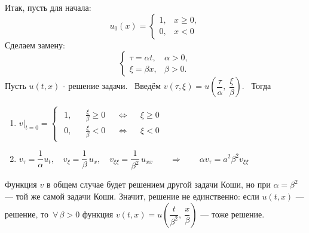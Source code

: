 \documentclass[../main.tex]{subfiles}
\begin{document}
Итак, пусть для начала:
\begin{equation*}
u_0(x) = \begin{cases} 
	1, &x \geq 0, \\
	0, &x < 0 
\end{cases} 
\end{equation*}
Сделаем замену: 
\begin{equation*}
\begin{cases}
	\tau = \alpha t, &\alpha > 0, \\
	\xi = \beta x, &\beta > 0.
\end{cases}
\end{equation*}
Пусть $u(t, x)$ - решение задачи. \ Введём $v(\tau, \xi) = u\left(\dfrac{\tau}{\alpha},\ \dfrac{\xi}{\beta}\right)$. \ Тогда
\begin{enumerate}
	\vspace{-0.7em} %
	\item $v\bigr|_{t=0} = \begin{cases} \begin{aligned}
		1, && \frac{\xi}{\beta} \geq 0 &&\Leftrightarrow && \xi \geq 0 \\
		0, && \frac{\xi}{\beta} < 0 && \Leftrightarrow && \xi < 0
	\end{aligned}\end{cases}$

	\item $v_\tau = \dfrac{1}{\alpha}u_t, \quad v_\xi = \dfrac{1}{\beta}\, u_x, \quad v_{\xi \xi} = \dfrac{1}{\beta^2}\, u_{xx} \qquad\Rightarrow\qquad \alpha v_{\tau} = a^2 \beta^2 v_{\xi \xi}$
\end{enumerate}

Функция $v$ в общем случае будет решением другой задачи Коши, но при $\alpha = \beta^2$ --- той же самой задачи Коши. Значит, решение не единственно: если $u(t,x)$ --- решение, то $\,\forall\, \beta > 0$ функция $v(t,x) = u\left(\dfrac{t}{\beta^2},\ \dfrac{x}{\beta}\right)$ --- тоже решение.
\end{document}
